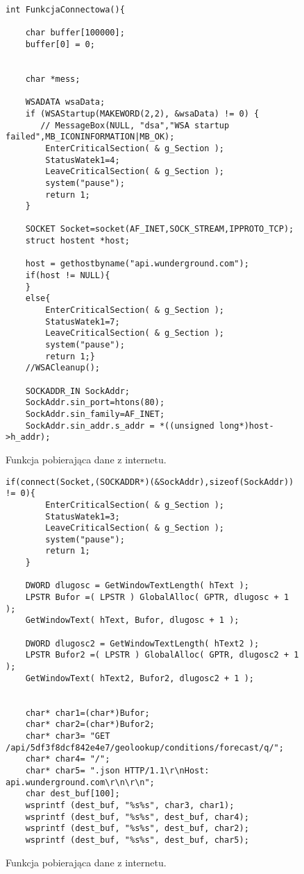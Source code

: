 \documentclass[a4paper,twoside,12pt]{mgr}
\begin{document}
\begin{figure}[H]
\centering
\begin{lstlisting}[frame=single]
int FunkcjaConnectowa(){
	
	char buffer[100000];
	buffer[0] = 0;
	
	
	char *mess;
	
	WSADATA wsaData;
    if (WSAStartup(MAKEWORD(2,2), &wsaData) != 0) {
       // MessageBox(NULL, "dsa","WSA startup failed",MB_ICONINFORMATION|MB_OK);
        EnterCriticalSection( & g_Section );
	 	StatusWatek1=4;
	 	LeaveCriticalSection( & g_Section );
        system("pause");
        return 1;
    }
  
    SOCKET Socket=socket(AF_INET,SOCK_STREAM,IPPROTO_TCP);
    struct hostent *host;
    
    host = gethostbyname("api.wunderground.com");
    if(host != NULL){
    }
    else{
		EnterCriticalSection( & g_Section );
	 	StatusWatek1=7;
	 	LeaveCriticalSection( & g_Section );
	 	system("pause");
	 	return 1;}
	//WSACleanup();

    SOCKADDR_IN SockAddr;
    SockAddr.sin_port=htons(80);
    SockAddr.sin_family=AF_INET;
    SockAddr.sin_addr.s_addr = *((unsigned long*)host->h_addr);
 \end{lstlisting}
\caption{Funkcja pobierająca dane z internetu.}%
\label{rys:etykieta}
\end{figure}
\begin{figure}[H]
\centering
\begin{lstlisting}[frame=single]   
    if(connect(Socket,(SOCKADDR*)(&SockAddr),sizeof(SockAddr)) != 0){
        EnterCriticalSection( & g_Section );
	 	StatusWatek1=3;
	 	LeaveCriticalSection( & g_Section );
        system("pause");
        return 1;
    }
    
   	DWORD dlugosc = GetWindowTextLength( hText );
	LPSTR Bufor =( LPSTR ) GlobalAlloc( GPTR, dlugosc + 1 );
	GetWindowText( hText, Bufor, dlugosc + 1 );
	
	DWORD dlugosc2 = GetWindowTextLength( hText2 );
	LPSTR Bufor2 =( LPSTR ) GlobalAlloc( GPTR, dlugosc2 + 1 );
	GetWindowText( hText2, Bufor2, dlugosc2 + 1 );
	
	
	char* char1=(char*)Bufor;
	char* char2=(char*)Bufor2;
	char* char3= "GET /api/5df3f8dcf842e4e7/geolookup/conditions/forecast/q/";
	char* char4= "/";
	char* char5= ".json HTTP/1.1\r\nHost: api.wunderground.com\r\n\r\n";
	char dest_buf[100]; 
	wsprintf (dest_buf, "%s%s", char3, char1);
	wsprintf (dest_buf, "%s%s", dest_buf, char4);
	wsprintf (dest_buf, "%s%s", dest_buf, char2);
	wsprintf (dest_buf, "%s%s", dest_buf, char5);

 \end{lstlisting}
\caption{Funkcja pobierająca dane z internetu.}%
\label{rys:etykieta}
\end{figure}
\end{document}
